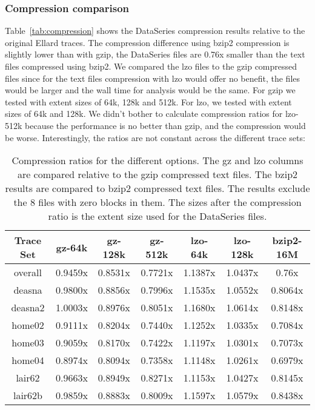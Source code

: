 \begin{itemize}
\end{itemize}

\subsubsection{Compression comparison}

Table~\ref{tab:compression} shows the DataSeries compression results
relative to the original Ellard traces.  The compression difference
using bzip2 compression is slightly lower than with gzip, the
DataSeries files are 0.76x smaller than the text files compressed
using bzip2.  We compared the lzo files to the gzip compressed files
since for the text files compression with lzo would offer no benefit,
the files would be larger and the wall time for analysis would be the
same.  For gzip we tested with extent sizes of 64k, 128k and 512k.
For lzo, we tested with extent sizes of 64k and 128k.  We didn't
bother to calculate compression ratios for lzo-512k because the
performance is no better than gzip, and the compression would be
worse.  Interestingly, the ratios are not constant across the
different trace sets:

\begin{table}
\begin{tabular}{|c|c|c|c|c|c|c|}\hline
Trace Set & gz-64k  & gz-128k & gz-512k & lzo-64k & lzo-128k & bzip2-16M \\ \hline
overall   & 0.9459x & 0.8531x & 0.7721x & 1.1387x & 1.0437x & 0.76x   \\
deasna    & 0.9800x & 0.8856x & 0.7996x & 1.1535x & 1.0552x & 0.8064x \\
deasna2   & 1.0003x & 0.8976x & 0.8051x & 1.1680x & 1.0614x & 0.8148x \\
home02    & 0.9111x & 0.8204x & 0.7440x & 1.1252x & 1.0335x & 0.7084x \\
home03    & 0.9059x & 0.8170x & 0.7422x & 1.1197x & 1.0301x & 0.7073x \\
home04    & 0.8974x & 0.8094x & 0.7358x & 1.1148x & 1.0261x & 0.6979x \\
lair62    & 0.9663x & 0.8949x & 0.8271x & 1.1153x & 1.0427x & 0.8145x \\
lair62b   & 0.9859x & 0.8883x & 0.8009x & 1.1597x & 1.0579x & 0.8438x \\
\hline
\end{tabular}
\label{table:ellard:compression}

\caption{Compression ratios for the different options.  The gz and lzo
columns are compared relative to the gzip compressed text files.  The
bzip2 results are compared to bzip2 compressed text files.  The
results exclude the 8 files with zero blocks in them.  The sizes after
the compression ratio is the extent size used for the DataSeries files.}

\end{table}

